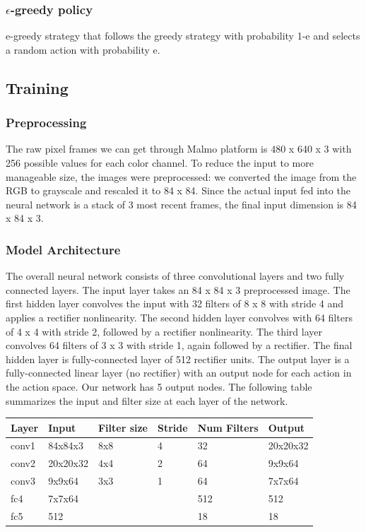 \documentclass{article}
\begin{document}
\begin{multicols}{2}
\subsubsection{$\epsilon$-greedy policy}

 e-greedy strategy that follows the greedy strategy with probability 1-e and selects a random action with probability e.


\subsection{Training}

\subsubsection{Preprocessing}

The raw pixel frames we can get through Malmo platform is 480 x 640 x 3 with 256 possible values for each color channel. To reduce the input to more manageable size, the images were preprocessed: we converted the image from the RGB to grayscale and rescaled it to 84 x 84. Since the actual input fed into the neural network is a stack of 3 most recent frames, the final input dimension is 84 x 84 x 3. 

\subsubsection{Model Architecture}

The overall neural network consists of three convolutional layers and two fully connected layers. The input layer takes an 84 x 84 x 3 preprocessed image. The first hidden layer convolves the input with 32 filters of 8 x 8 with stride 4 and applies a rectifier nonlinearity. The second hidden layer convolves with 64 filters of 4 x 4 with stride 2, followed by a rectifier nonlinearity. The third layer convolves 64 filters of 3 x 3 with stride 1, again followed by a rectifier. The final hidden layer is fully-connected layer of 512 rectifier units. The output layer is a fully-connected linear layer (no rectifier) with an output node for each action in the action space. Our network has 5 output nodes. The following table summarizes the input and filter size at each layer of the network.

\begin{tabular}{|l|l|l|l|l|l|}
        \hline
Layer & Input    & Filter size & Stride & Num Filters & Output   \\ \hline
conv1 & 84x84x3  & 8x8         & 4      & 32          & 20x20x32 \\ \hline
conv2 & 20x20x32 & 4x4         & 2      & 64          & 9x9x64   \\ \hline
conv3 & 9x9x64   & 3x3         & 1      & 64          & 7x7x64   \\ \hline
fc4   & 7x7x64   &             &        & 512         & 512      \\ \hline
fc5   & 512      &             &        & 18          & 18     \\ \hline
\end{tabular}
  

\end{multicols}
\end{document}
